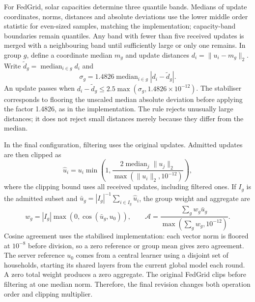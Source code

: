 For FedGrid, solar capacities determine three quantile bands. Medians of update coordinates, norms, distances and absolute deviations use the lower middle order statistic for even-sized samples, matching the implementation; capacity-band boundaries remain quantiles. Any band with fewer than five received updates is merged with a neighbouring band until sufficiently large or only one remains. In group $g$, define a coordinate median $m_g$ and update distances $d_i=\|u_i-m_g\|_2$. Write $\widetilde d_g=\operatorname{median}_{i\in g}d_i$ and
\begin{equation}
\sigma_g=1.4826\operatorname{median}_{i\in g}|d_i-\widetilde d_g|.
\end{equation}
An update passes when $d_i-\widetilde d_g\leq2.5\max(\sigma_g,1.4826\times10^{-12})$. The stabiliser corresponds to flooring the unscaled median absolute deviation before applying the factor 1.4826, as in the implementation. The rule rejects unusually large distances; it does not reject small distances merely because they differ from the median.

In the final configuration, filtering uses the original updates. Admitted updates are then clipped as
\begin{equation}
\widehat u_i=u_i\min\left(1,\frac{2\operatorname{median}_j\|u_j\|_2}{\max(\|u_i\|_2,10^{-12})}\right),
\end{equation}
where the clipping bound uses all received updates, including filtered ones. If $I_g$ is the admitted subset and $\bar u_g=|I_g|^{-1}\sum_{i\in I_g}\widehat u_i$, the group weight and aggregate are
\begin{equation}
w_g=|I_g|\max(0,\cos(\bar u_g,u_0)),\qquad
\mathcal A=\frac{\sum_gw_g\bar u_g}{\max(\sum_gw_g,10^{-12})}.
\end{equation}
Cosine agreement uses the stabilised implementation: each vector norm is floored at $10^{-8}$ before division, so a zero reference or group mean gives zero agreement. The server reference $u_0$ comes from a central learner using a disjoint set of households, starting its shared layers from the current global model each round. A zero total weight produces a zero aggregate. The original FedGrid clips before filtering at one median norm. Therefore, the final revision changes both operation order and clipping multiplier.

